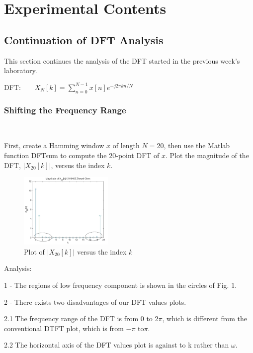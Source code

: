 \documentclass[journal]{IEEEtran}
\begin{document}
\section{Experimental Contents}
\label{sec:guidelines}


\subsection{Continuation of DFT Analysis}
This section continues the analysis of the DFT started in the previous week's laboratory.

DFT: \(\displaystyle ~~~~~~\) \(X_N[k] = \sum\limits_{n=0}^{N-1} x[n]e^{-j2\pi kn/N}\)

\subsubsection{Shifting the Frequency Range } 
$~$


First, create a Hamming window \(x\) of length \(N = 20\), then use the Matlab function DFTsum to compute the 20-point DFT of \(x\). 
Plot the magnitude of the DFT, \(\lvert X_{20}[k]\rvert\), versus the index \(k\).
\begin{figure}[H]
   \centering
   \includegraphics[width=0.4\textwidth]{521.png} %
\caption{Plot of \(\lvert X_{20}[k]\rvert\) versus the index \(k\)}
   \label{fig:1}
 \end{figure}

\textcolor[rgb]{0,0.6,1}{Analysis:}

\textcolor[rgb]{0,0.6,1}{1 -} The regions of low frequency component is shown in the circles of Fig. 1.

\textcolor[rgb]{0,0.6,1}{2 -} There exists two disadvantages of our DFT values plots.

\textcolor[rgb]{0,0.6,1}{2.1} The frequency range of the DFT is from 0 to \(2\pi\), which is different from the conventional DTFT plot, which is from \(-\pi\) to\(\pi\). 

\textcolor[rgb]{0,0.6,1}{2.2} The horizontal axis of the DFT values plot is against to k rather than \(\omega\).
\end{document}
